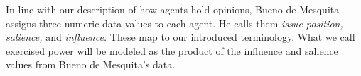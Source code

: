 In line with our description of how agents hold opinions, Bueno de Mesquita \cite{mesquita_1984} assigns three numeric data values to each agent. He calls them {\it issue position,}  {\it salience,} and {\it influence.} These map to our introduced terminology. What we call   {exercised power} will be modeled as the product of the   {influence} and   {salience} values from Bueno de Mesquita's data.


%
%
